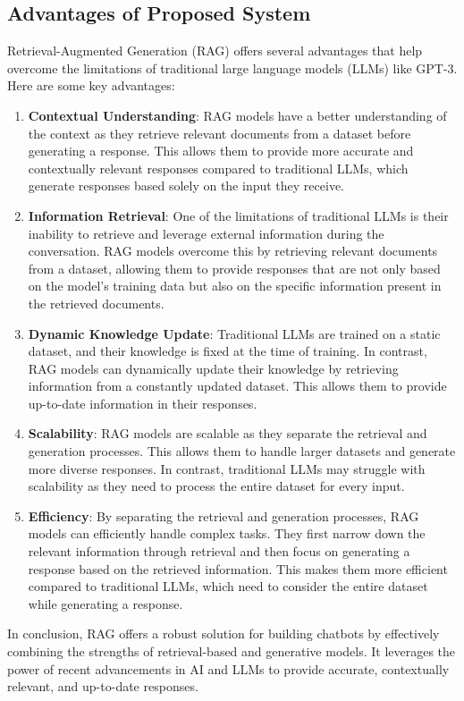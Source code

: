 \subsection{Advantages of Proposed System}
Retrieval-Augmented Generation (RAG) offers several advantages that help overcome the limitations of traditional large language models (LLMs) like GPT-3. Here are some key advantages:
\begin{enumerate}
  \item \textbf{Contextual Understanding}: RAG models have a better understanding of the context as they retrieve relevant documents from a dataset before generating a response. This allows them to provide more accurate and contextually relevant responses compared to traditional LLMs, which generate responses based solely on the input they receive.
  \item \textbf{Information Retrieval}: One of the limitations of traditional LLMs is their inability to retrieve and leverage external information during the conversation. RAG models overcome this by retrieving relevant documents from a dataset, allowing them to provide responses that are not only based on the model's training data but also on the specific information present in the retrieved documents.
  \item \textbf{Dynamic Knowledge Update}: Traditional LLMs are trained on a static dataset, and their knowledge is fixed at the time of training. In contrast, RAG models can dynamically update their knowledge by retrieving information from a constantly updated dataset. This allows them to provide up-to-date information in their responses.
  \item \textbf{Scalability}: RAG models are scalable as they separate the retrieval and generation processes. This allows them to handle larger datasets and generate more diverse responses. In contrast, traditional LLMs may struggle with scalability as they need to process the entire dataset for every input.
  \item \textbf{Efficiency}: By separating the retrieval and generation processes, RAG models can efficiently handle complex tasks. They first narrow down the relevant information through retrieval and then focus on generating a response based on the retrieved information. This makes them more efficient compared to traditional LLMs, which need to consider the entire dataset while generating a response.
\end{enumerate}
In conclusion, RAG offers a robust solution for building chatbots by effectively combining the strengths of retrieval-based and generative models. It leverages the power of recent advancements in AI and LLMs to provide accurate, contextually relevant, and up-to-date responses.
